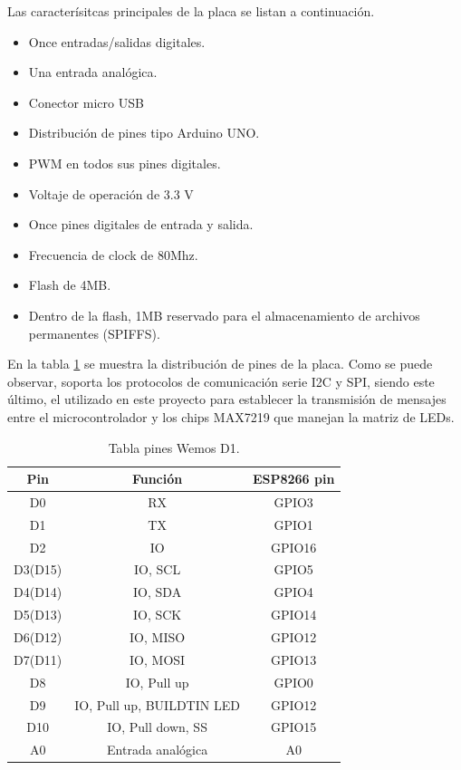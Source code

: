     Las caracterísitcas principales de la placa se listan a continuación.
    \begin{itemize}
        \item Once entradas/salidas digitales.
        \item Una entrada analógica.
        \item Conector micro USB
        \item Distribución de pines tipo Arduino UNO.
        \item PWM en todos sus pines digitales.
        \item Voltaje de operación de 3.3 V
        \item Once pines digitales de entrada y salida.
        \item Frecuencia de clock de 80Mhz.
        \item Flash de 4MB.
        \item Dentro de la flash, 1MB reservado para el almacenamiento de archivos permanentes (SPIFFS).
    \end{itemize}
    
    En la tabla \ref{table:wemos-pin} se muestra la distribución de pines de la placa. Como se puede observar, soporta los protocolos de comunicación serie I2C y SPI, siendo este último, el utilizado en este proyecto para establecer la transmisión de mensajes entre el microcontrolador y los chips MAX7219 que manejan la matriz de LEDs.
    
    \begin{table}[ht]
        \centering
        \caption{Tabla pines Wemos D1.}
        \label{table:wemos-pin}
        \begin{tabular}{ccc}
        \hline
            Pin     & Función                   & ESP8266 pin \\ \hline
            D0      & RX                        & GPIO3       \\
            D1      & TX                        & GPIO1       \\
            D2      & IO                        & GPIO16      \\
            D3(D15) & IO, SCL                   & GPIO5       \\
            D4(D14) & IO, SDA                   & GPIO4       \\ 
            D5(D13) & IO, SCK                   & GPIO14      \\
            D6(D12) & IO, MISO                  & GPIO12      \\
            D7(D11) & IO, MOSI                  & GPIO13      \\
            D8      & IO, Pull up               & GPIO0       \\
            D9      & IO, Pull up, BUILDTIN LED & GPIO12      \\
            D10     & IO, Pull down, SS         & GPIO15      \\
            A0      & Entrada analógica         & A0          \\ \hline
        \end{tabular}
    \end{table}
    
